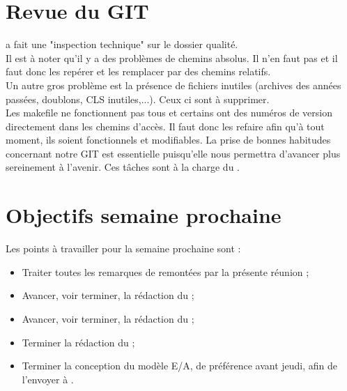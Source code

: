 \documentclass [a4paper] {article}
\begin{document}
\section{Revue du GIT}

\nomTuteurPedago{} a fait une "inspection technique" sur le dossier qualité.
\\
Il est à noter qu'il y a des problèmes de chemins absolus. Il n'en faut pas et il faut donc les repérer et les remplacer par des chemins relatifs.
\\
Un autre gros problème est la présence de fichiers inutiles (archives des années passées, doublons, CLS inutiles,...). Ceux ci sont à supprimer.
\\
Les makefile ne fonctionnent pas tous et certains ont des numéros de version directement dans les chemins d'accès. Il faut donc les refaire afin qu'à tout moment, ils soient fonctionnels et modifiables. La prise de bonnes habitudes concernant notre GIT est essentielle puisqu'elle nous permettra d'avancer plus sereinement à l'avenir. Ces tâches sont à la charge du \RD{}.

\section{Objectifs semaine prochaine}
Les points à travailler pour la semaine prochaine sont :
\begin{itemize}
\item Traiter toutes les remarques de \nomTuteurPedago{} remontées par la présente réunion ;
\item Avancer, voir terminer, la rédaction du \PTV{} ;
\item Avancer, voir terminer, la rédaction du \DSI{} ;
\item Terminer la rédaction du \DSE{} ;
\item Terminer la conception du modèle E/A, de préférence avant jeudi, afin de l'envoyer à \nomTuteurPedago{}.
\end{itemize}


\newpage
\end{document}
